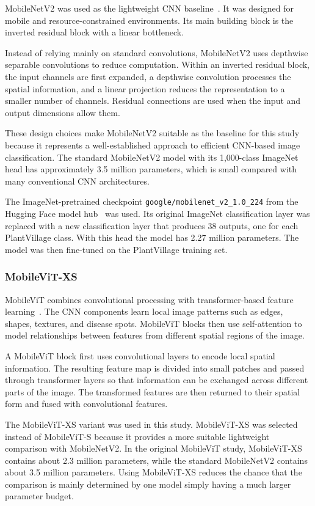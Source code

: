 \documentclass[conference]{IEEEtran}
\begin{document}
MobileNetV2 was used as the lightweight CNN baseline~\cite{sandler2018mobilenetv2}. It was designed for mobile and resource-constrained environments. Its main building block is the inverted residual block with a linear bottleneck.

Instead of relying mainly on standard convolutions, MobileNetV2 uses depthwise separable convolutions to reduce computation. Within an inverted residual block, the input channels are first expanded, a depthwise convolution processes the spatial information, and a linear projection reduces the representation to a smaller number of channels. Residual connections are used when the input and output dimensions allow them.

These design choices make MobileNetV2 suitable as the baseline for this study because it represents a well-established approach to efficient CNN-based image classification. The standard MobileNetV2 model with its 1,000-class ImageNet head has approximately 3.5 million parameters, which is small compared with many conventional CNN architectures.

The ImageNet-pretrained checkpoint \texttt{google/mobilenet\_v2\_1.0\_224} from the Hugging Face model hub~\cite{wolf2020transformers} was used. Its original ImageNet classification layer was replaced with a new classification layer that produces 38 outputs, one for each PlantVillage class. With this head the model has 2.27 million parameters. The model was then fine-tuned on the PlantVillage training set.

\subsubsection{MobileViT-XS}

MobileViT combines convolutional processing with transformer-based feature learning~\cite{mehta2022mobilevit}. The CNN components learn local image patterns such as edges, shapes, textures, and disease spots. MobileViT blocks then use self-attention to model relationships between features from different spatial regions of the image.

A MobileViT block first uses convolutional layers to encode local spatial information. The resulting feature map is divided into small patches and passed through transformer layers so that information can be exchanged across different parts of the image. The transformed features are then returned to their spatial form and fused with convolutional features.

The MobileViT-XS variant was used in this study. MobileViT-XS was selected instead of MobileViT-S because it provides a more suitable lightweight comparison with MobileNetV2. In the original MobileViT study, MobileViT-XS contains about 2.3 million parameters, while the standard MobileNetV2 contains about 3.5 million parameters. Using MobileViT-XS reduces the chance that the comparison is mainly determined by one model simply having a much larger parameter budget.
\end{document}
